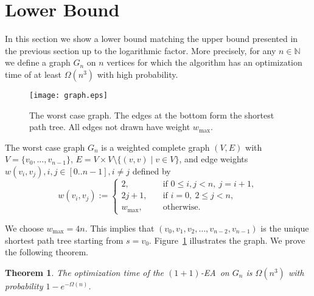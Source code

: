 \documentclass{sig-alternate}
\newtheorem{thm}{Theorem}  %
\newcommand{\N}{{\mathbb{N}}}
\newcommand{\fref}[1]{Figure~\ref{#1}}
\newcommand{\ea}{\mbox{$(1+1)$-EA}}
\begin{document}


\section{Lower Bound}
\label{sec:lower}

\newcommand{\bu}{\mathbf{u}}

In this section we show a lower bound matching the upper bound presented in the previous section up to the logarithmic factor.
More precisely, for any $n\in\N$ we define a graph $G_n$ on $n$ vertices for which the algorithm has an optimization time of at least $\Omega(n^3)$ with high probability.

\begin{figure}
  \centering
  \texttt{[image: graph.eps]}
  \caption{\label{fig:graph}The worst case graph. The edges at the bottom form the shortest path tree.
           All edges not drawn have weight $w_{\max}$.}
\end{figure}%

The worst case graph $G_n$ is a weighted complete graph $(V,E)$ with
$V=\{v_0,\ldots,v_{n-1}\}$, $E=V\times V\setminus\{(v,v) \mid v\in V\}$,
and edge weights $w(v_i,v_j), i,j\in[0..n-1], i \neq j$ defined by
\[
    w(v_i,v_j) := \left\{\begin{array}{ll}
        2,       & \quad \text{if }0\leq i,j<n,\ j=i+1,\\
        2j+1,    & \quad \text{if }i=0,\ 2\leq j<n, \\
        w_{\max},& \quad \text{otherwise.}
      \end{array}\right.
\]

We choose $w_{\max}=4n$.
This implies that $(v_0,v_1,v_2,\ldots,v_{n-2},v_{n-1})$ is the unique shortest path tree starting
from $s=v_0$.  \fref{fig:graph} illustrates the graph.  We prove the following theorem.

\begin{thm}\label{t:lowl}
  The optimization time of the \ea\ on $G_n$ is $\Omega(n^3)$
  with probability $1-e^{-\Omega(n)}$.
\end{thm}
\end{document}
